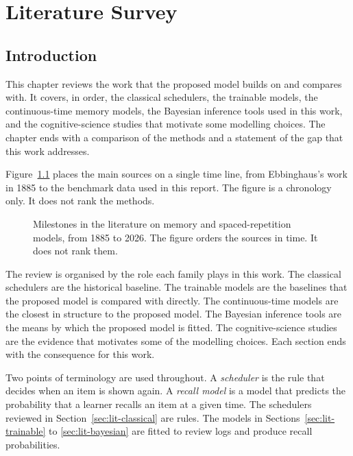 \chapter{Literature Survey}
\label{ch:literature}

\section{Introduction}
\label{sec:lit-introduction}

This chapter reviews the work that the proposed model builds on and compares with. It covers, in
order, the classical schedulers, the trainable models, the continuous-time memory models, the
Bayesian inference tools used in this work, and the cognitive-science studies that motivate some
modelling choices. The chapter ends with a comparison of the methods and a statement of the gap
that this work addresses.

Figure~\ref{fig:tk_lit_timeline} places the main sources on a single time line, from Ebbinghaus's
work in 1885 to the benchmark data used in this report. The figure is a chronology only. It does not
rank the methods.

\begin{figure}[htbp]
  \centering
  
  \caption{Milestones in the literature on memory and spaced-repetition models, from 1885 to 2026.
    The figure orders the sources in time. It does not rank them.}
  \label{fig:tk_lit_timeline}
\end{figure}

The review is organised by the role each family plays in this work. The classical schedulers are the
historical baseline. The trainable models are the baselines that the proposed model is compared with
directly. The continuous-time models are the closest in structure to the proposed model. The Bayesian
inference tools are the means by which the proposed model is fitted. The cognitive-science studies are the
evidence that motivates some of the modelling choices. Each section ends with the consequence for this work.

Two points of terminology are used throughout. A \emph{scheduler} is the rule that decides when an
item is shown again. A \emph{recall model} is a model that predicts the probability that a learner
recalls an item at a given time. The schedulers reviewed in Section~\ref{sec:lit-classical} are
rules. The models in Sections~\ref{sec:lit-trainable} to \ref{sec:lit-bayesian} are fitted to review
logs and produce recall probabilities.

